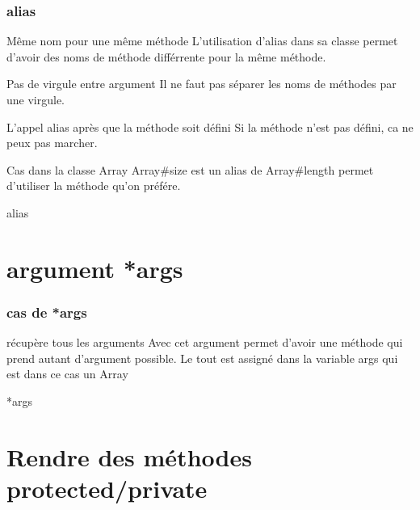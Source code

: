 \documentclass{beamer}
\begin{document}
\begin{frame}
  \frametitle{alias}
  \begin{block}{Même nom pour une même m\'ethode}
    L'utilisation d'alias dans sa classe permet d'avoir des noms de m\'ethode
    diff\'errente pour la même m\'ethode.
  \end{block}
  \begin{block}{Pas de virgule entre argument}
    Il ne faut pas s\'eparer les noms de m\'ethodes par une virgule.
  \end{block}
  \begin{block}{L'appel alias après que la m\'ethode soit d\'efini}
    Si la m\'ethode n'est pas d\'efini, ca ne peux pas marcher.
  \end{block}
  \begin{block}{Cas dans la classe Array}
    Array\#size est un alias de Array\#length permet d'utiliser la m\'ethode qu'on pr\'ef\'ere.
  \end{block}
\end{frame}

\begin{frame}
  \begin{beamerboxesrounded}{alias}
    
  \end{beamerboxesrounded}
\end{frame}

\section{argument *args}

\begin{frame}
  \frametitle{cas de *args}
  \begin{block}{r\'ecupère tous les arguments}
    Avec cet argument permet d'avoir une m\'ethode qui prend
    autant d'argument possible. Le tout est assign\'e dans
    la variable args qui est dans ce cas un Array
  \end{block}
\end{frame}

\begin{frame}
  \begin{beamerboxesrounded}{*args}
    
  \end{beamerboxesrounded}
\end{frame}

\section{Rendre des m\'ethodes protected/private}
\end{document}
